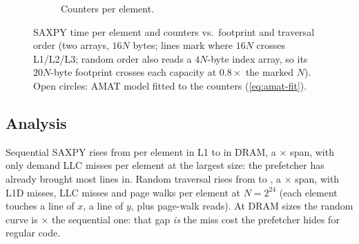 \begin{figure}[tbp]
\begin{subfigure}[t]{0.49\linewidth}
{}
    \caption{Counters per element.}
  \end{subfigure}
  \caption{SAXPY time per element and counters vs.\ footprint and traversal order (two 
  arrays, $16N$ bytes; lines mark where $16N$ crosses L1/L2/L3; random order also reads a $4N$-byte index
  array, so its $20N$-byte footprint crosses each capacity at $0.8\times$ the marked $N$). Open circles: AMAT model fitted to the
  counters (\cref{eq:amat-fit}).}\label{fig:cache-miss}
\end{figure}

\subsection{Analysis}
Sequential SAXPY rises from  per element in L1 to
 in DRAM, a $\times$ span, with only
 demand LLC misses per element at the largest size: the prefetcher has already
brought most lines in. Random traversal rises from  to
, a $\times$ span, with 
L1D misses,  LLC misses and  page walks per element at
$N=2^{24}$ (each element touches a line of $x$, a line of $y$, plus page-walk reads). At DRAM sizes the
random curve is $\times$ the sequential one: that gap \emph{is} the miss cost the
prefetcher hides for regular code.

